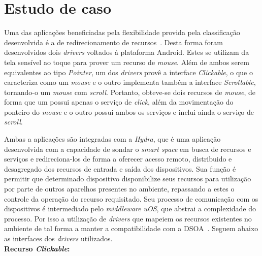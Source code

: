 \section{Estudo de caso}
\label{sec:estudoDeCaso}

Uma das aplicações beneficiadas pela flexibilidade provida pela classificação desenvolvida é a de redirecionamento de recursos~\cite{lucas2011}. Desta forma foram desenvolvidos dois \emph{drivers} voltados à plataforma Android. Estes se utilizam da tela sensível ao toque para prover um recurso de \emph{mouse}. Além de ambos serem equivalentes ao tipo \emph{Pointer}, um dos \emph{drivers} provê a interface \emph{Clickable}, o que o caracteriza como um \emph{mouse} e o outro implementa também a interface \emph{Scrollable}, tornando-o um \emph{mouse} com \emph{scroll}. Portanto, obteve-se dois recursos de \emph{mouse}, de forma que um possui apenas o serviço de \emph{click}, além da movimentação do ponteiro do \emph{mouse} e o outro possui ambos os serviços e inclui ainda o serviço de \emph{scroll}.

Ambas a aplicações são integradas com a \emph{Hydra}, que é uma aplicação desenvolvida com a capacidade de sondar o \emph{smart space} em busca de recursos e serviços e redireciona-los de forma a oferecer acesso remoto, distribuido e desagregado dos recursos de entrada e saída dos dispositivos. Sua função é permitir que determinado dispositivo disponibilize seus recursos para utilização por parte de outros aparelhos presentes no ambiente, repassando a estes o controle da operação do recurso requisitado. Seu processo de comunicação com os dispositivos é intermediado pelo \emph{middleware uOS}, que abstrai a complexidade do processo. Por isso a utilização de \emph{drivers} que mapeiem os recursos existentes no ambiente de tal forma a manter a compatibilidade com a DSOA~\cite{lucas2011}. Seguem abaixo as interfaces dos \emph{drivers} utilizados. \\

\textbf{Recurso \emph{Clickable}:}

